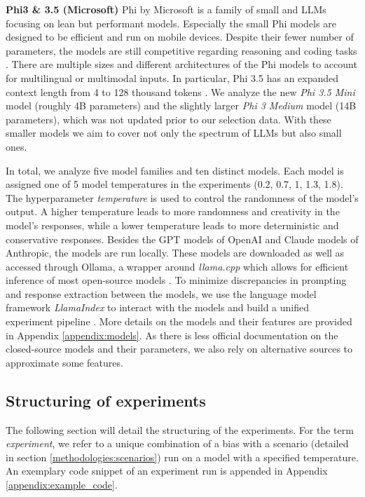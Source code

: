 \par \textbf{Phi3 \& 3.5 (Microsoft)} Phi by Microsoft is a family of small and LLMs focusing on lean but performant models. Especially the small Phi models are designed to be efficient and run on mobile devices. Despite their fewer number of parameters, the models are still competitive regarding reasoning and coding tasks \parencite{abdin2024phi}. There are multiple sizes and different architectures of the Phi models to account for multilingual or multimodal inputs. In particular, Phi 3.5 has an expanded context length from 4 to 128 thousand tokens \parencite{abdin2024phi}. We analyze the new \textit{Phi 3.5 Mini} model (roughly 4B parameters) and the slightly larger \textit{Phi 3 Medium} model (14B parameters), which was not updated prior to our selection data. With these smaller models we aim to cover not only the spectrum of LLMs but also small ones.

\setlength{\parindent}{0pt}
\par In total, we analyze five model families and ten distinct models. Each model is assigned one of 5 model temperatures in the experiments (0.2, 0.7, 1, 1.3, 1.8). The hyperparameter \textit{temperature} is used to control the randomness of the model's output. A higher temperature leads to more randomness and creativity in the model's responses, while a lower temperature leads to more deterministic and conservative responses. Besides the GPT models of OpenAI and Claude models of Anthropic, the models are run locally. These models are downloaded as well as accessed through Ollama, a wrapper around \textit{llama.cpp} which allows for efficient inference of most open-source models \parencite{gerganov2023llamacpp}. To minimize discrepancies in prompting and response extraction between the models, we use the language model framework \textit{LlamaIndex} to interact with the models and build a unified experiment pipeline \parencite{liullamaindex2022}. More details on the models and their features are provided in Appendix \ref{appendix:models}. As there is less official documentation on the closed-source models and their parameters, we also rely on alternative sources to approximate some features.


\subsection{Structuring of experiments}
\par The following section will detail the structuring of the experiments. For the term \textit{experiment}, we refer to a unique combination of a bias with a scenario (detailed in section \ref{methodologies:scenarios}) run on a model with a specified temperature. An exemplary code snippet of an experiment run is appended in Appendix \ref{appendix:example_code}.

